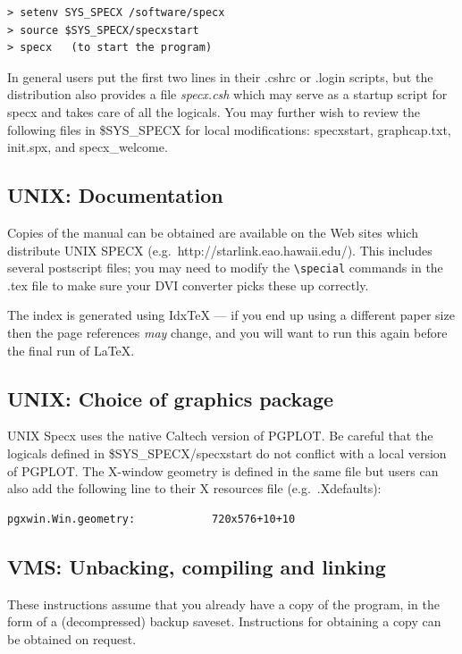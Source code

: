 \documentclass[11pt,twoside]{report}
\begin{document}
\begin{verbatim}
> setenv SYS_SPECX /software/specx
> source $SYS_SPECX/specxstart
> specx   (to start the program)
\end{verbatim}

In general users put the first two lines in their .cshrc or .login
scripts, but the distribution also provides a file {\em specx.csh}
which may serve as a startup script for specx and takes care of all
the logicals. You may further wish to review the following files in
\$SYS\_SPECX for local modifications: specxstart, graphcap.txt, init.spx,
and specx\_welcome.

\subsection{UNIX: Documentation}

Copies of the manual can be obtained are available on the
Web sites which distribute UNIX SPECX (e.g.\ http://starlink.eao.hawaii.edu/).
This includes several postscript files; you may need to modify the
\verb+\special+ commands in the .tex file to make sure your DVI
converter picks these up correctly.

The index is generated using Idx{\TeX} --- if you end up using a
different paper size then the page references {\em may} change, and
you will want to run this again before the final run of \LaTeX.


\subsection{UNIX: Choice of graphics package}

UNIX Specx uses the native Caltech version of PGPLOT. Be careful that
the logicals defined in \$SYS\_SPECX/specxstart do not conflict with
a local version of PGPLOT. The X-window geometry is defined in
the same file but users can also add the following line to their X
resources file (e.g.\ .Xdefaults):
\begin{verbatim}
pgxwin.Win.geometry:            720x576+10+10
\end{verbatim}

\subsection{VMS: Unbacking, compiling and linking}

These instructions assume that you already have a copy of the program, in the
form of a (decompressed) backup saveset. Instructions for obtaining a copy
can be obtained on request.
\end{document}
